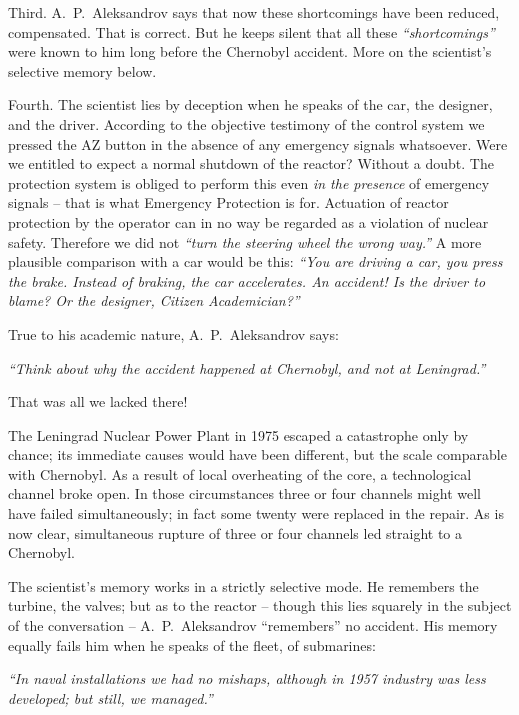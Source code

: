 \documentclass[openright]{bookest}
\begin{document}
Third. A.~P.~Aleksandrov says that now these shortcomings have been reduced, compensated. That is correct. But he keeps silent that all these \textit{``shortcomings''} were known to him long before the Chernobyl accident. More on the scientist's selective memory below.

Fourth. The scientist lies by deception when he speaks of the car, the designer, and the driver. According to the objective testimony of the control system we pressed the AZ button in the absence of any emergency signals whatsoever. Were we entitled to expect a normal shutdown of the reactor? Without a doubt. The protection system is obliged to perform this even \textit{in the presence} of emergency signals -- that is what Emergency Protection is for. Actuation of reactor protection by the operator can in no way be regarded as a violation of nuclear safety. Therefore we did not \textit{``turn the steering wheel the wrong way.''} A more plausible comparison with a car would be this: \textit{``You are driving a car, you press the brake. Instead of braking, the car accelerates. An accident! Is the driver to blame? Or the designer, Citizen Academician?''}

True to his academic nature, A.~P.~Aleksandrov says:

\begin{personal}
\textit{``Think about why the accident happened at Chernobyl, and not at Leningrad.''}
\end{personal}

That was all we lacked there!

The Leningrad Nuclear Power Plant in 1975 escaped a catastrophe only by chance; its immediate causes would have been different, but the scale comparable with Chernobyl. As a result of local overheating of the core, a technological channel broke open. In those circumstances three or four channels might well have failed simultaneously; in fact some twenty were replaced in the repair. As is now clear, simultaneous rupture of three or four channels led straight to a Chernobyl.

The scientist's memory works in a strictly selective mode. He remembers the turbine, the valves; but as to the reactor -- though this lies squarely in the subject of the conversation -- A.~P.~Aleksandrov ``remembers'' no accident. His memory equally fails him when he speaks of the fleet, of submarines:

\begin{personal}
\textit{``In naval installations we had no mishaps, although in 1957 industry was less developed; but still, we managed.''}
\end{personal}
\end{document}
